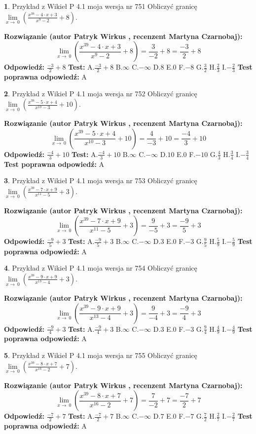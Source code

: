 \documentclass[12pt, a4paper]{article}
\theoremstyle{definition} %
\newtheorem{zad}{}
\newcommand{\zadStart}[1]{\begin{zad}#1\newline}
\newcommand{\zadStop}{\end{zad}}
\newcommand{\rozwStart}[2]{\noindent \textbf{Rozwiązanie (autor #1 , recenzent #2): }\newline}
\newcommand{\rozwStop}{\newline}
\newcommand{\odpStart}{\noindent \textbf{Odpowiedź:}\newline}
\newcommand{\odpStop}{\newline}
\newcommand{\testStart}{\noindent \textbf{Test:}\newline}
\newcommand{\testStop}{\newline}
\newcommand{\kluczStart}{\noindent \textbf{Test poprawna odpowiedź:}\newline}
\newcommand{\kluczStop}{\newline}
\begin{document}
\zadStart{Przykład z Wikieł P 4.1 moja wersja nr 751}
Obliczyć granicę $\lim\limits_{x\to\ 0}(\frac{x^{39}-4 \cdot x +3}{x^{9}-2}+8)$.
\zadStop
\rozwStart{Patryk Wirkus}{Martyna Czarnobaj}
$$\lim\limits_{x\to\ 0}(\frac{x^{39}-4 \cdot x +3}{x^{9}-2}+8)=\frac{3}{-2}+8=\frac{-3}{2}+8$$
\rozwStop
\odpStart
$\frac{-3}{2}+8$
\odpStop
\testStart
A.$\frac{-3}{2}+8$
B.$\infty$
C.$-\infty$
D.$8$
E.$0$
F.$-8$
G.$\frac{3}{2}$
H.$\frac{2}{3}$
I.$-\frac{2}{3}$
\testStop
\kluczStart
A
\kluczStop



\zadStart{Przykład z Wikieł P 4.1 moja wersja nr 752}
Obliczyć granicę $\lim\limits_{x\to\ 0}(\frac{x^{39}-5 \cdot x +4}{x^{10}-3}+10)$.
\zadStop
\rozwStart{Patryk Wirkus}{Martyna Czarnobaj}
$$\lim\limits_{x\to\ 0}(\frac{x^{39}-5 \cdot x +4}{x^{10}-3}+10)=\frac{4}{-3}+10=\frac{-4}{3}+10$$
\rozwStop
\odpStart
$\frac{-4}{3}+10$
\odpStop
\testStart
A.$\frac{-4}{3}+10$
B.$\infty$
C.$-\infty$
D.$10$
E.$0$
F.$-10$
G.$\frac{4}{3}$
H.$\frac{3}{4}$
I.$-\frac{3}{4}$
\testStop
\kluczStart
A
\kluczStop



\zadStart{Przykład z Wikieł P 4.1 moja wersja nr 753}
Obliczyć granicę $\lim\limits_{x\to\ 0}(\frac{x^{39}-7 \cdot x +9}{x^{11}-5}+3)$.
\zadStop
\rozwStart{Patryk Wirkus}{Martyna Czarnobaj}
$$\lim\limits_{x\to\ 0}(\frac{x^{39}-7 \cdot x +9}{x^{11}-5}+3)=\frac{9}{-5}+3=\frac{-9}{5}+3$$
\rozwStop
\odpStart
$\frac{-9}{5}+3$
\odpStop
\testStart
A.$\frac{-9}{5}+3$
B.$\infty$
C.$-\infty$
D.$3$
E.$0$
F.$-3$
G.$\frac{9}{5}$
H.$\frac{5}{9}$
I.$-\frac{5}{9}$
\testStop
\kluczStart
A
\kluczStop



\zadStart{Przykład z Wikieł P 4.1 moja wersja nr 754}
Obliczyć granicę $\lim\limits_{x\to\ 0}(\frac{x^{39}-9 \cdot x +9}{x^{13}-4}+3)$.
\zadStop
\rozwStart{Patryk Wirkus}{Martyna Czarnobaj}
$$\lim\limits_{x\to\ 0}(\frac{x^{39}-9 \cdot x +9}{x^{13}-4}+3)=\frac{9}{-4}+3=\frac{-9}{4}+3$$
\rozwStop
\odpStart
$\frac{-9}{4}+3$
\odpStop
\testStart
A.$\frac{-9}{4}+3$
B.$\infty$
C.$-\infty$
D.$3$
E.$0$
F.$-3$
G.$\frac{9}{4}$
H.$\frac{4}{9}$
I.$-\frac{4}{9}$
\testStop
\kluczStart
A
\kluczStop



\zadStart{Przykład z Wikieł P 4.1 moja wersja nr 755}
Obliczyć granicę $\lim\limits_{x\to\ 0}(\frac{x^{39}-8 \cdot x +7}{x^{16}-2}+7)$.
\zadStop
\rozwStart{Patryk Wirkus}{Martyna Czarnobaj}
$$\lim\limits_{x\to\ 0}(\frac{x^{39}-8 \cdot x +7}{x^{16}-2}+7)=\frac{7}{-2}+7=\frac{-7}{2}+7$$
\rozwStop
\odpStart
$\frac{-7}{2}+7$
\odpStop
\testStart
A.$\frac{-7}{2}+7$
B.$\infty$
C.$-\infty$
D.$7$
E.$0$
F.$-7$
G.$\frac{7}{2}$
H.$\frac{2}{7}$
I.$-\frac{2}{7}$
\testStop
\kluczStart
A
\kluczStop
\end{document}
